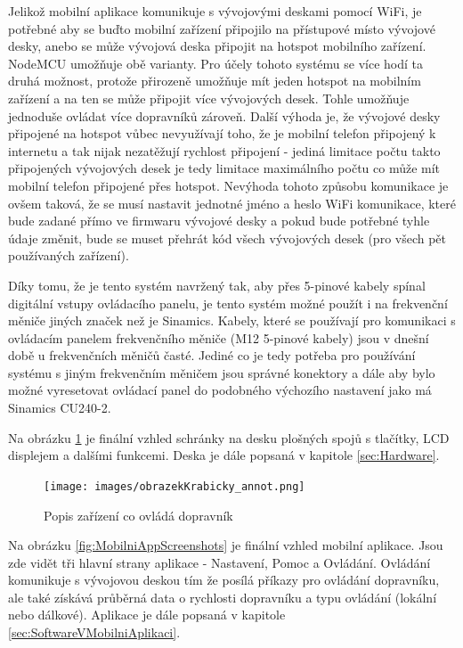 Jelikož mobilní aplikace komunikuje s vývojovými deskami pomocí WiFi, je potřebné aby se buďto mobilní zařízení připojilo na přístupové místo vývojové desky, anebo se může vývojová deska připojit na hotspot mobilního zařízení. NodeMCU umožňuje obě varianty. Pro účely tohoto systému se více hodí ta druhá možnost, protože přirozeně umožňuje mít jeden hotspot na mobilním zařízení a na ten se může připojit více vývojových desek. Tohle umožňuje jednoduše ovládat více dopravníků zároveň. Další výhoda je, že vývojové desky připojené na hotspot vůbec nevyužívají toho, že je mobilní telefon připojený k internetu a tak nijak nezatěžují rychlost připojení - jediná limitace počtu takto připojených vývojových desek je tedy limitace maximálního počtu co může mít mobilní telefon připojené přes hotspot. Nevýhoda tohoto způsobu komunikace je ovšem taková, že se musí nastavit jednotné jméno a heslo WiFi komunikace, které bude zadané přímo ve firmwaru vývojové desky a pokud bude potřebné tyhle údaje změnit, bude se muset přehrát kód všech vývojových desek (pro všech pět používaných zařízení).

Díky tomu, že je tento systém navržený tak, aby přes 5-pinové kabely spínal digitální vstupy ovládacího panelu, je tento systém možné použít i na frekvenční měniče jiných značek než je Sinamics. Kabely, které se používají pro komunikaci s ovládacím panelem frekvenčního měniče (M12 5-pinové kabely) jsou v dnešní době u frekvenčních měničů časté. Jediné co je tedy potřeba pro používání systému s jiným frekvenčním měničem jsou správné konektory a dále aby bylo možné vyresetovat ovládací panel do podobného výchozího nastavení jako má Sinamics CU240-2.

Na obrázku \ref{fig:PopisZarizeniCoOvladaDopravnik}  je finální vzhled schránky na desku plošných spojů s tlačítky, LCD displejem a dalšími funkcemi. Deska je dále popsaná v kapitole \ref{sec:Hardware}.

\begin{figure}[hptb]
	\centering
	\texttt{[image: images/obrazekKrabicky\_annot.png]}
	\caption{Popis zařízení co ovládá dopravník}
	\label{fig:PopisZarizeniCoOvladaDopravnik}
\end{figure}

Na obrázku \ref{fig:MobilniAppScreenshots} je finální vzhled mobilní aplikace. Jsou zde vidět tři hlavní strany aplikace - Nastavení, Pomoc a Ovládání. Ovládání komunikuje s vývojovou deskou tím že posílá příkazy pro ovládání dopravníku, ale také získává průběrná data o rychlosti dopravníku a typu ovládání (lokální nebo dálkové). Aplikace je dále popsaná v kapitole \ref{sec:SoftwareVMobilniAplikaci}.

